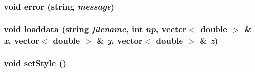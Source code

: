 \hypertarget{util_8C_a0}{
\subsubsection[error]{\setlength{\rightskip}{0pt plus 5cm}void error (string {\em message})}}
\label{util_8C_a0}


\hypertarget{util_8C_a3}{
\subsubsection[loaddata]{\setlength{\rightskip}{0pt plus 5cm}void loaddata (string {\em filename}, int {\em np}, vector$<$ double $>$ \& {\em x}, vector$<$ double $>$ \& {\em y}, vector$<$ double $>$ \& {\em z})}}
\label{util_8C_a3}


\hypertarget{util_8C_a4}{
\subsubsection[setStyle]{\setlength{\rightskip}{0pt plus 5cm}void set\-Style ()}}
\label{util_8C_a4}


